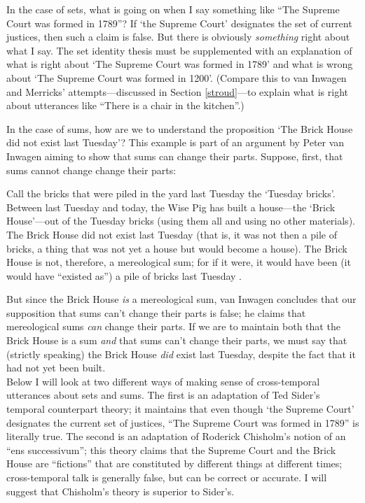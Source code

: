 \documentclass[11pt]{article}
\newenvironment{squote}{%
\begin{spacing}{1}
\begin{list}{}{%
\setlength{\labelwidth}{0pt}%
\rightmargin\leftmargin%
}
\item\relax
}{%
\end{list}%
\end{spacing}
}
\begin{document}
\begin{spacing}{1.5}
In the case of sets, what is going on when I say something like ``The
Supreme Court was formed in 1789''?  If `the Supreme Court' designates
the set of current justices, then such a claim is false.  But there is
obviously {\em something} right about what I say.  The set identity
thesis must be supplemented with an explanation of what is right about
`The Supreme Court was formed in 1789' and what is wrong about `The
Supreme Court was formed in 1200'.  (Compare this to van Inwagen and
Merricks' attempts---discussed in Section \ref{stroud}---to explain
what is right about utterances like ``There is a chair in the
kitchen''.)

In the case of sums, how are we to understand the proposition `The
Brick House did not exist last Tuesday'?  This example is part of an
argument by Peter van Inwagen aiming to show that sums can change
their parts.  Suppose, first, that sums cannot change change their
parts:

\begin{squote}
Call the bricks that were piled in the yard last Tuesday the `Tuesday
bricks'.  Between last Tuesday and today, the Wise Pig has built a
house---the `Brick House'---out of the Tuesday bricks (using them all
and using no other materials).  The Brick House did not exist last
Tuesday (that is, it was not then a pile of bricks, a thing that was
not yet a house but would become a house).  The Brick House is not,
therefore, a mereological sum; for if it were, it would have been (it
would have ``existed as'') a pile of bricks last Tuesday
\citeyearpar[616]{inwagen2006}.
\end{squote}

But since the Brick House {\em is} a mereological sum, van Inwagen
concludes that our supposition that sums can't change their parts is
false; he claims that mereological sums {\em can} change their parts.
If we are to maintain both that the Brick House is a sum {\em and}
that sums can't change their parts, we must say that (strictly
speaking) the Brick House {\em did} exist last Tuesday, despite the
fact that it had not yet been built. \\

Below I will look at two different ways of making sense of
cross-temporal utterances about sets and sums.  The first is an
adaptation of Ted Sider's temporal counterpart theory; it maintains
that even though `the Supreme Court' designates the current set of
justices, ``The Supreme Court was formed in 1789'' is literally true.
The second is an adaptation of Roderick Chisholm's notion of an ``ens
successivum''; this theory claims that the Supreme Court and the Brick
House are ``fictions'' that are constituted by different things at
different times; cross-temporal talk is generally false, but can be
correct or accurate.  I will suggest that Chisholm's theory is
superior to Sider's.


\end{spacing}
\end{document}
